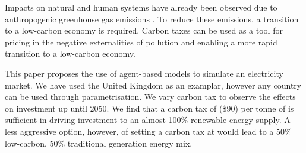 Impacts on natural and human systems have already been observed due to anthropogenic greenhouse gas emissions \cite{Masson-Delmotte2018}. To reduce these emissions, a transition to a low-carbon economy is required. Carbon taxes can be used as a tool for pricing in the negative externalities of pollution and enabling a more rapid transition to a low-carbon economy.

This paper proposes the use of agent-based models to simulate an electricity market. We have used the United Kingdom as an examplar, however any country can be used through parametrisation. We vary carbon tax to observe the effects on investment up until 2050. We find that a carbon tax of  (\$90) per tonne of  is sufficient in driving investment to an almost 100\% renewable energy supply. A less aggressive option, however, of setting a carbon tax at  would lead to a 50\% low-carbon, 50\% traditional generation energy mix.

